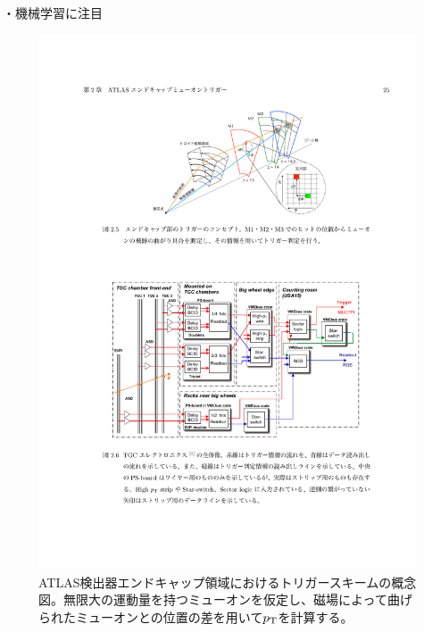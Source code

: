 ・機械学習に注目



\begin{figure}[tb]
  \centering
  \includegraphics[clip, width=14cm]{fig/3/akatsuka_mt_trigger_scheme.pdf}
  \caption{ATLAS検出器エンドキャップ領域におけるトリガースキームの概念図\cite{article:akatsuka-mron}。無限大の運動量を持つミューオンを仮定し、磁場によって曲げられたミューオンとの位置の差を用いて$p_\mathrm{T}$を計算する。}
  \label{fig:trigger-scheme}
\end{figure}









